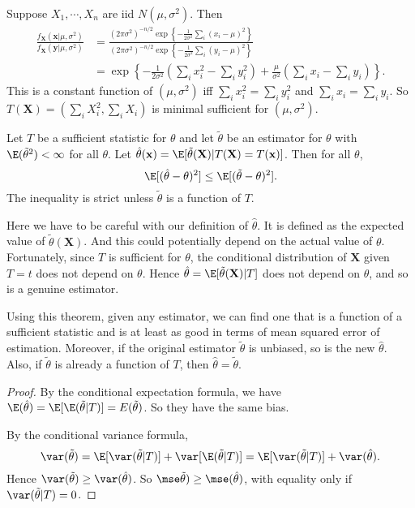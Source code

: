 \documentclass[a4paper]{article}
\begin{document}
\begin{eg}
  Suppose $X_1, \cdots, X_n$ are iid $N(\mu, \sigma^2)$. Then
  \begin{align*}
    \frac{f_\mathbf{X}(\mathbf{x}|\mu, \sigma^2)}{f_\mathbf{X}(\mathbf{y}|\mu, \sigma^2)} &= \frac{(2\pi\sigma^2)^{-n/2}\exp\left\{-\frac{1}{2\sigma^2}\sum_i(x_i - \mu)^2\right\}}{(2\pi\sigma^2)^{-n/2}\exp\left\{-\frac{1}{2\sigma^2}\sum_i(y_i - \mu)^2\right\}}\\
    &=\exp\left\{-\frac{1}{2\sigma^2}\left(\sum_i x_i^2 - \sum_i y_i^2\right) + \frac{\mu}{\sigma^2}\left(\sum_{i}x_i - \sum_i y_i\right)\right\}.
  \end{align*}
  This is a constant function of $(\mu, \sigma^2)$ iff  $\sum_i x_i^2 = \sum_i y_i^2$ and $\sum_i x_i = \sum_i y_i$. So $T(\mathbf{X}) = (\sum_i X_i^2, \sum_i X_i)$ is minimal sufficient for $(\mu, \sigma^2)$.
\end{eg}

\begin{thm}
  Let $T$ be a sufficient statistic for $\theta$ and let $\tilde{\theta}$ be an estimator for $\theta$ with $\E(\tilde{\theta}^2) < \infty$ for all $\theta$. Let $\hat{\theta}(\mathbf{x}) = \E[\tilde{\theta}(\mathbf{X})|T(\mathbf{X}) = T(\mathbf{x})]$. Then for all $\theta$,
  \[
    \E[(\hat{\theta} - \theta)^2] \leq \E[(\tilde{\theta} - \theta)^2].
  \]
  The inequality is strict unless $\tilde{\theta}$ is a function of $T$.
\end{thm}
Here we have to be careful with our definition of $\hat{\theta}$. It is defined as the expected value of $\tilde{\theta}(\mathbf{X})$. And this could potentially depend on the actual value of $\theta$. Fortunately, since $T$ is sufficient for $\theta$, the conditional distribution of $\mathbf{X}$ given $T = t$ does not depend on $\theta$. Hence $\hat{\theta} = \E[\tilde{\theta}(\mathbf{X})|T]$ does not depend on $\theta$, and so is a genuine estimator.

Using this theorem, given any estimator, we can find one that is a function of a sufficient statistic and is at least as good in terms of mean squared error of estimation. Moreover, if the original estimator $\tilde{\theta}$ is unbiased, so is the new $\hat{\theta}$. Also, if $\tilde{\theta}$ is already a function of $T$, then $\hat{\theta} = \tilde{\theta}$.

\begin{proof}
  By the conditional expectation formula, we have $\E(\hat{\theta}) = \E[\E(\tilde{\theta}|T)] = E(\tilde{\theta})$. So they have the same bias.

  By the conditional variance formula,
  \[
    \var(\tilde{\theta}) = \E[\var (\tilde{\theta}|T)] + \var [\E(\tilde{\theta}|T)] = \E[\var(\tilde{\theta}|T)] + \var(\hat{\theta}).
  \]
  Hence $\var(\tilde{\theta}) \geq \var (\hat{\theta})$. So $\mse\tilde{\theta}) \geq \mse(\hat{\theta})$, with equality only if $\var(\tilde{\theta}|T) = 0$.
\end{proof}
\end{document}

